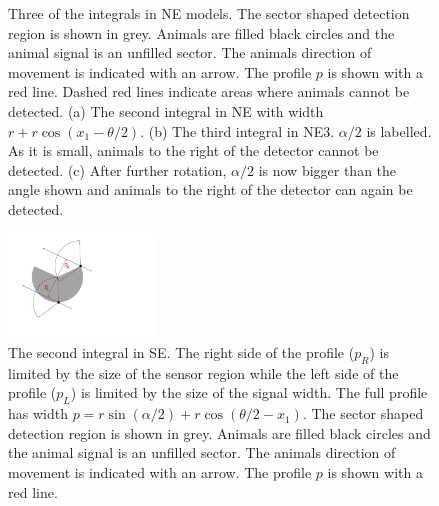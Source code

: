 \begin{figure}[t]
  \centering
{
}
\caption[Three of the integrals in NE models]{
Three of the integrals in NE models.
The sector shaped detection region is shown in grey.
Animals are filled black circles and the animal signal is an unfilled sector.
The animals direction of movement is indicated with an arrow.
The profile $p$ is shown with a red line.
Dashed red lines indicate areas where animals cannot be detected.
(a) The second integral in NE with width $r + r\cos(x_1 - \theta/2)$.
(b) The third integral in NE3.
$\alpha/2$ is labelled.
As it is small, animals to the right of the detector cannot be detected.
(c) After further rotation, $\alpha/2$ is now bigger than the angle shown and animals to the right of the detector can again be detected.
}
\label{fig:NE}
\end{figure}


\begin{figure}[t]
        \centering
        \includegraphics[width=0.35\textwidth, trim=1cm 4cm 9cm 1cm]{imgs/se3.pdf}
\caption[The second integral in SE]{The second integral in SE.
The right side of the profile ($p_R$) is limited by the size of the sensor region  while the left side of the profile ($p_L$) is limited by the size of the signal width.
The full profile has width $p = r\sin(\alpha/2) +r\cos(\theta/2-x_1)$.
The sector shaped detection region is shown in grey.
Animals are filled black circles and the animal signal is an unfilled sector.
The animals direction of movement is indicated with an arrow.
The profile $p$ is shown with a red line.
  }
\label{fig:se3}
\end{figure}

